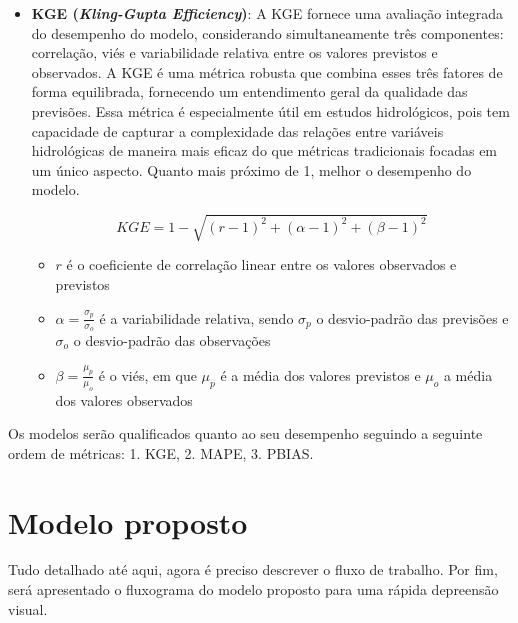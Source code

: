\begin{itemize}
	\item \textbf{KGE (\textit{Kling-Gupta Efficiency})}: A KGE fornece uma avaliação integrada do desempenho do modelo, considerando simultaneamente três componentes: correlação, viés e variabilidade relativa entre os valores previstos e observados. A KGE é uma métrica robusta que combina esses três fatores de forma equilibrada, fornecendo um entendimento geral da qualidade das previsões. Essa métrica é especialmente útil em estudos hidrológicos, pois tem capacidade de capturar a complexidade das relações entre variáveis hidrológicas de maneira mais eficaz do que métricas tradicionais focadas em um único aspecto. Quanto mais próximo de 1, melhor o desempenho do modelo.\cite{Gupta2009}
	
	\begin{equation}
		KGE = 1 - \sqrt{(r - 1)^2 + (\alpha - 1)^2 + (\beta - 1)^2}
	\end{equation}
	\begin{itemize}
		\item $r$ é o coeficiente de correlação linear entre os valores observados e previstos 
		\item $\alpha = \frac{\sigma_p}{\sigma_o}$ é a variabilidade relativa, sendo $\sigma_p$ o desvio-padrão das previsões e $\sigma_o$ o desvio-padrão das observações
		\item $\beta = \frac{\mu_p}{\mu_o}$ é o viés, em que $\mu_p$ é a média dos valores previstos e $\mu_o$ a média dos valores observados		
	\end{itemize}
\end{itemize}

Os modelos serão qualificados quanto ao seu desempenho seguindo a seguinte ordem de métricas: 1. KGE, 2. MAPE, 3. PBIAS.


\section{Modelo proposto}

Tudo detalhado até aqui, agora é preciso descrever o fluxo de trabalho. Por fim, será apresentado o fluxograma do modelo proposto para uma rápida depreensão visual.

